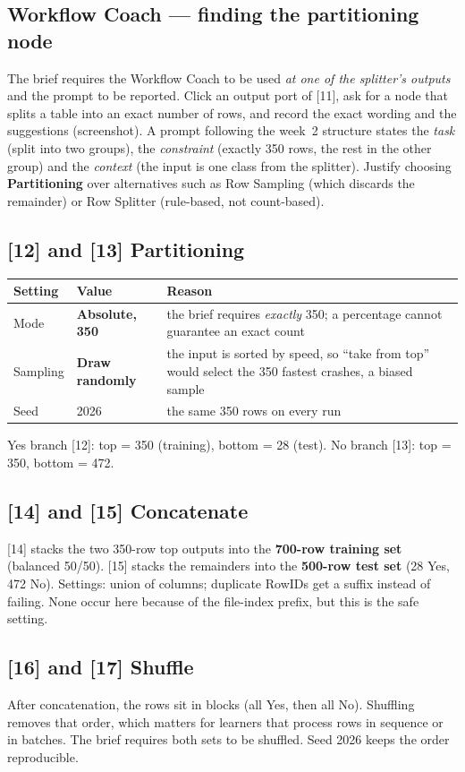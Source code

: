 \documentclass[11pt,a4paper]{article}
\newcommand{\nd}[1]{\textsf{\textbf{#1}}}          %
\begin{document}
\subsection*{Workflow Coach --- finding the partitioning node}
The brief requires the Workflow Coach to be used \emph{at one of the splitter's outputs} and the prompt to be
reported. Click an output port of [11], ask for a node that splits a table into an exact number of rows, and record the
exact wording and the suggestions (screenshot). A prompt following the week~2 structure states the
\emph{task} (split into two groups), the \emph{constraint} (exactly 350 rows, the rest in the other group) and the
\emph{context} (the input is one class from the splitter). Justify choosing \nd{Partitioning} over alternatives such as
Row Sampling (which discards the remainder) or Row Splitter (rule-based, not count-based).

\subsection*{[12] and [13] Partitioning}
\begin{tabularx}{\linewidth}{@{}p{3.4cm}p{3.0cm}L@{}}
\toprule Setting & Value & Reason \\ \midrule
Mode & \textbf{Absolute, 350} & the brief requires \emph{exactly} 350; a percentage cannot guarantee an exact count \\
Sampling & \textbf{Draw randomly} & the input is sorted by speed, so ``take from top'' would select the 350 fastest crashes, a biased sample \\
Seed & 2026 & the same 350 rows on every run \\ \bottomrule
\end{tabularx}
Yes branch [12]: top = 350 (training), bottom = 28 (test). No branch [13]: top = 350, bottom = 472.

\subsection*{[14] and [15] Concatenate}
[14] stacks the two 350-row top outputs into the \textbf{700-row training set} (balanced 50/50). [15] stacks the
remainders into the \textbf{500-row test set} (28 Yes, 472 No). Settings: union of columns; duplicate RowIDs get a
suffix instead of failing. None occur here because of the file-index prefix, but this is the safe setting.

\subsection*{[16] and [17] Shuffle}
After concatenation, the rows sit in blocks (all Yes, then all No). Shuffling removes that order, which matters for
learners that process rows in sequence or in batches. The brief requires both sets to be shuffled. Seed 2026 keeps the
order reproducible.
\end{document}
